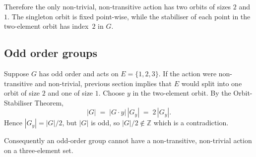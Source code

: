 \documentclass[12pt]{article}
\begin{document}
Therefore the only non-trivial, non-transitive action has two orbits
of sizes \(2\) and \(1\). The singleton orbit is fixed point-wise, while
the stabiliser of each point in the two-element orbit has index~\(2\) in
\(G\).

\subsection*{Odd order groups}
Suppose \(G\) has odd order and acts on \(E=\{1,2,3\}\).
If the action were non-transitive and non-trivial, previous section implies that \(E\) would split into
one orbit of size \(2\) and one of size \(1\).
Choose \(y\) in the two-element orbit.
By the Orbit-Stabiliser Theorem,
\[
|G| \;=\; |G\!\cdot\!y|\,|G_{y}| \;=\; 2\,|G_{y}|.
\]
Hence \(|G_{y}| = |G|/2\), but \(|G|\) is odd, so \(|G|/2\notin\mathbb Z\) which is a contradiction.

Consequently an odd-order group cannot have a non-transitive, non-trivial action on a three-element set.
\end{document}
